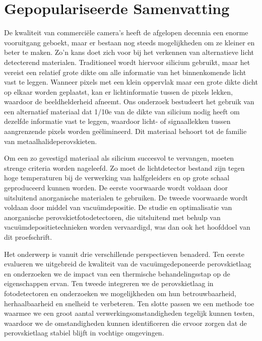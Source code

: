 \chapter{Gepopulariseerde Samenvatting}\label{ch:popabstractnl}

De kwaliteit van commerciële camera's heeft de afgelopen decennia een enorme vooruitgang geboekt, maar er bestaan nog steeds mogelijkheden om ze kleiner en beter te maken. Zo'n kans doet zich voor bij het verkennen van alternatieve licht detecterend materialen. Traditioneel wordt hiervoor silicium gebruikt, maar het vereist een relatief grote dikte om alle informatie van het binnenkomende licht vast te leggen. Wanneer pixels met een klein oppervlak maar een grote dikte dicht op elkaar worden geplaatst, kan er lichtinformatie tussen de pixels lekken, waardoor de beeldhelderheid afneemt. Ons onderzoek bestudeert het gebruik van een alternatief materiaal dat 1/10e van de dikte van silicium nodig heeft om dezelfde informatie vast te leggen, waardoor licht- of signaallekken tussen aangrenzende pixels worden geëlimineerd. Dit materiaal behoort tot de familie van metaalhalideperovskieten.

Om een zo gevestigd materiaal als silicium succesvol te vervangen, moeten strenge criteria worden nageleefd. Zo moet de lichtdetector bestand zijn tegen hoge temperaturen bij de verwerking van halfgeleiders en op grote schaal geproduceerd kunnen worden. De eerste voorwaarde wordt voldaan door uitsluitend anorganische materialen te gebruiken. De tweede voorwaarde wordt voldaan door middel van vacuümdepositie. De studie en optimalisatie van anorganische perovskietfotodetectoren, die uitsluitend met behulp van vacuümdepositietechnieken worden vervaardigd, was dan ook het hoofddoel van dit proefschrift.

Het onderwerp is vanuit drie verschillende perspectieven benaderd. Ten eerste evalueren we uitgebreid de kwaliteit van de vacuümgedeponeerde perovskietlaag en onderzoeken we de impact van een thermische behandelingsstap op de eigenschappen ervan. Ten tweede integreren we de perovskietlaag in fotodetectoren en onderzoeken we mogelijkheden om hun betrouwbaarheid, herhaalbaarheid en snelheid te verbeteren. Ten slotte passen we een methode toe waarmee we een groot aantal verwerkingsomstandigheden tegelijk kunnen testen, waardoor we de omstandigheden kunnen identificeren die ervoor zorgen dat de perovskietlaag stabiel blijft in vochtige omgevingen.


\cleardoublepage
